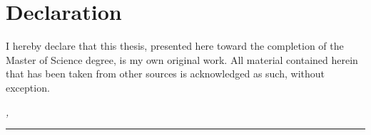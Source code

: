 %
\chapter*{Declaration}
\label{sec:declaration}
\thispagestyle{empty}

I hereby declare that this thesis, presented here toward the completion of the Master of Science degree, is my own original work. All material contained herein that has been taken from other sources is acknowledged as such, without exception.

\bigskip

\noindent\textit{\thesisUniversityCity, \thesisDate}

\smallskip

\begin{flushright}
	\begin{minipage}{5cm}
		\rule{\textwidth}{1pt}
		\centering\authorName
	\end{minipage}
\end{flushright}

